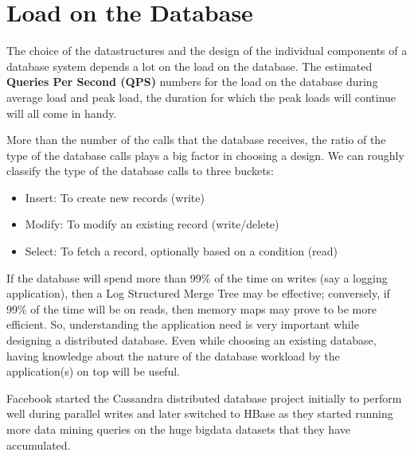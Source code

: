 \section{Load on the Database}

The choice of the datastructures and the design of the individual components of a database system depends a lot on the load on the database. The estimated \textbf{Queries Per Second (QPS)} numbers for the load on the database during average load and peak load, the duration for which the peak loads will continue will all come in handy.

More than the number of the calls that the database receives, the ratio of the type of the database calls plays a big factor in choosing a design. We can roughly classify the type of the database calls to three buckets:
\begin{itemize}
\item Insert: To create new records (write)
\item Modify: To modify an existing record (write/delete)
\item Select: To fetch a record, optionally based on a condition (read)
\end{itemize}

If the database will spend more than 99\% of the time on writes (say a logging application), then a Log Structured Merge Tree \cite{O_Neil_1996} may be effective; conversely, if 99\% of the time will be on reads, then memory maps may prove to be more efficient. So, understanding the application need is very important while designing a distributed database. Even while choosing an existing database, having knowledge about the nature of the database workload by the application(s) on top will be useful.

Facebook started the Cassandra\cite{Lakshman_2009} distributed database project initially to perform well during parallel writes and later switched to HBase as they started running more data mining queries on the huge bigdata datasets that they have accumulated.